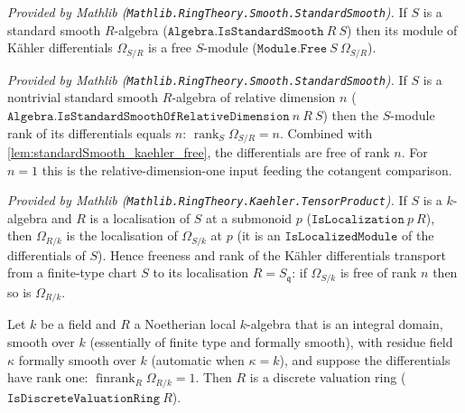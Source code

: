\begin{lemma}
  \label{lem:standardSmooth_kaehler_free}
  \mathlibok
  \textit{Provided by Mathlib
  (\texttt{Mathlib.RingTheory.Smooth.StandardSmooth}).}
  If \(S\) is a standard smooth \(R\)-algebra
  (\(\texttt{Algebra.IsStandardSmooth}\ R\ S\)) then its module of K\"ahler
  differentials \(\Omega_{S/R}\) is a free \(S\)-module
  (\(\texttt{Module.Free}\ S\ \Omega_{S/R}\)).
\end{lemma}

\begin{lemma}
  \label{lem:standardSmooth_kaehler_rank}
  \mathlibok
  \textit{Provided by Mathlib
  (\texttt{Mathlib.RingTheory.Smooth.StandardSmooth}).}
  If \(S\) is a nontrivial standard smooth \(R\)-algebra of relative
  dimension \(n\)
  (\(\texttt{Algebra.IsStandardSmoothOfRelativeDimension}\ n\ R\ S\)) then the
  \(S\)-module rank of its differentials equals \(n\):
  \(\operatorname{rank}_S \Omega_{S/R} = n\). Combined with
  \cref{lem:standardSmooth_kaehler_free}, the differentials are free of rank
  \(n\). For \(n = 1\) this is the relative-dimension-one input feeding the
  cotangent comparison.
\end{lemma}

\begin{lemma}
  \label{lem:kaehler_isLocalizedModule_mathlib}
  \mathlibok
  \textit{Provided by Mathlib
  (\texttt{Mathlib.RingTheory.Kaehler.TensorProduct}).}
  If \(S\) is a \(k\)-algebra and \(R\) is a localisation of \(S\) at a
  submonoid \(p\) (\(\texttt{IsLocalization}\ p\ R\)), then \(\Omega_{R/k}\)
  is the localisation of \(\Omega_{S/k}\) at \(p\) (it is an
  \(\texttt{IsLocalizedModule}\) of the differentials of \(S\)). Hence
  freeness and rank of the K\"ahler differentials transport from a
  finite-type chart \(S\) to its localisation \(R = S_{\mathfrak q}\): if
  \(\Omega_{S/k}\) is free of rank \(n\) then so is \(\Omega_{R/k}\).
\end{lemma}

\begin{lemma}
  \label{lem:smooth_stalk_isDVR}
  \leanok
  Let \(k\) be a field and \(R\) a Noetherian local \(k\)-algebra that is an
  integral domain, smooth over \(k\) (essentially of finite type and formally
  smooth), with residue field \(\kappa\) formally smooth over \(k\)
  (automatic when \(\kappa = k\)), and suppose the differentials have rank
  one: \(\operatorname{finrank}_R \Omega_{R/k} = 1\). Then \(R\) is a discrete
  valuation ring (\(\texttt{IsDiscreteValuationRing}\ R\)).
\end{lemma}

